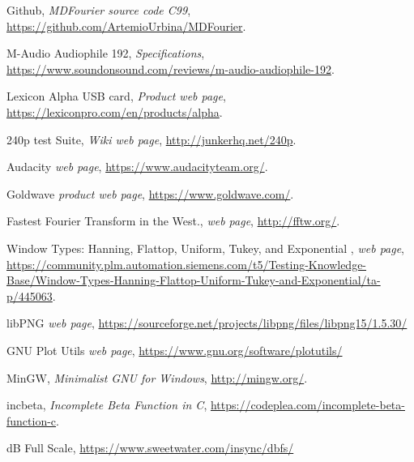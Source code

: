 \documentclass[10pt,a4paper]{report}
\begin{document}
\begin{thebibliography}{9}
	Github,
	\textit{MDFourier source code C99},
	\url{https://github.com/ArtemioUrbina/MDFourier}.
	
	M-Audio Audiophile 192,
	\textit{Specifications},
	\url{https://www.soundonsound.com/reviews/m-audio-audiophile-192}.
	
	Lexicon Alpha USB card,
	\textit{Product web page},
	\url{https://lexiconpro.com/en/products/alpha}.
	
	240p test Suite,
	\textit{Wiki web page},
	\url{http://junkerhq.net/240p}.
	
	Audacity
	\textit{web page},
	\url{https://www.audacityteam.org/}.
	
	Goldwave
	\textit{product web page},
	\url{https://www.goldwave.com/}.
	
	Fastest Fourier Transform in the West.,
	\textit{web page},
	\url{http://fftw.org/}.
	
	Window Types: Hanning, Flattop, Uniform, Tukey, and Exponential ,
	\textit{web page},
	\url{https://community.plm.automation.siemens.com/t5/Testing-Knowledge-Base/Window-Types-Hanning-Flattop-Uniform-Tukey-and-Exponential/ta-p/445063}.
	
	libPNG
	\textit{web page},
	\url{https://sourceforge.net/projects/libpng/files/libpng15/1.5.30/}
	
	GNU Plot Utils
	\textit{web page},
	\url{https://www.gnu.org/software/plotutils/}
	
	MinGW, 
	\textit{Minimalist GNU for Windows},
	\url{http://mingw.org/}.
	
	incbeta, 
	\textit{Incomplete Beta Function in C},
	\url{https://codeplea.com/incomplete-beta-function-c}.
	
	dB Full Scale, 
	\url{https://www.sweetwater.com/insync/dbfs/}
\end{thebibliography}
\end{document}

